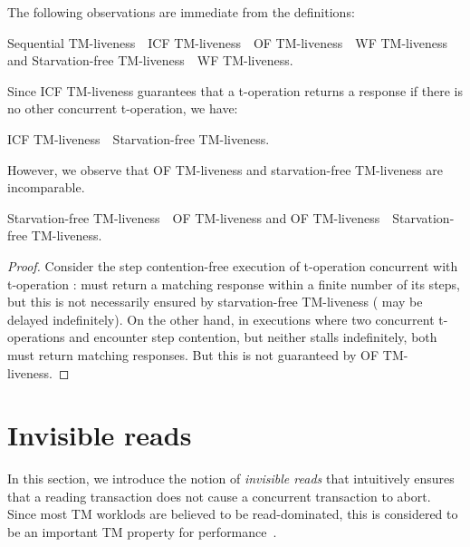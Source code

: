 The following observations are immediate from the definitions:
\begin{observation}
Sequential TM-liveness~~ICF TM-liveness~~OF TM-liveness~~WF TM-liveness
and
Starvation-free TM-liveness~~WF TM-liveness.
\end{observation}
Since ICF TM-liveness guarantees that a t-operation returns a response if there is no other concurrent t-operation,
we have:
\begin{observation}
ICF TM-liveness~~Starvation-free TM-liveness.
\end{observation}
However, we observe that OF TM-liveness and starvation-free TM-liveness are incomparable.
\begin{observation}
Starvation-free TM-liveness~~OF TM-liveness and OF TM-liveness~~Starvation-free TM-liveness.
\end{observation}
\begin{proof}
Consider the step contention-free execution of t-operation  concurrent with t-operation : 
must return a matching response within a finite number of its steps, but this is not necessarily ensured by starvation-free
TM-liveness ( may be delayed indefinitely).
On the other hand, in executions where two concurrent t-operations  and  encounter step contention, but
neither stalls indefinitely, both must return matching responses. But this is not guaranteed by OF TM-liveness.
\end{proof}
\section{Invisible reads}
\label{sec:inv}
In this section, we introduce the notion of \emph{invisible reads} that intuitively ensures that
a reading transaction does not cause a concurrent transaction to abort.
Since most TM worklods are believed to be read-dominated, this is considered to be an important TM property for
performance~\cite{stmbench7, Attiya09-tmread}.


